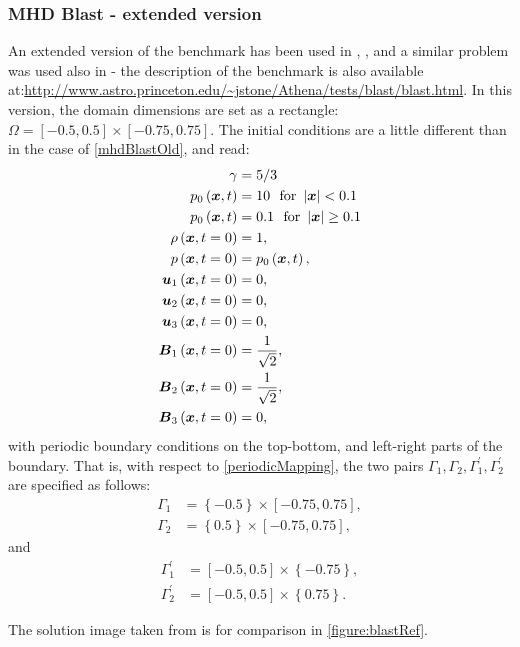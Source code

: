 \subsubsection{MHD Blast - extended version}
\label{sec:blastNew}
An extended version of the benchmark has been used in \cite{blastNew1}, \cite{athenaBlast}, and a similar problem was used also in \cite{blastNew2} - the description of the benchmark is also available at:\url{http://www.astro.princeton.edu/~jstone/Athena/tests/blast/blast.html}.
In this version, the domain dimensions are set as a rectangle: $\Omega = [-0.5, 0.5] \times [-0.75, 0.75]$.
The initial conditions are a little different than in the case of \cref{mhdBlastOld}, and read:
\begin{align}
\label{mhdBlastNew}
\gamma & =  5 / 3\\ \nonumber
p_0\left(\mbox{\boldmath $x$}, t\right) & =  10\ \ \text{for}\ \left|\mbox{\boldmath $x$}\right| < 0.1\\ \nonumber
p_0\left(\mbox{\boldmath $x$}, t\right) & =  0.1\ \ \text{for}\ \left|\mbox{\boldmath $x$}\right| \geq 0.1\\ \nonumber
\rho\left(\mbox{\boldmath $x$}, t = 0\right) & =  1,\\ \nonumber
p\left(\mbox{\boldmath $x$}, t = 0\right) & =  p_0\left(\mbox{\boldmath $x$}, t\right),\\ \nonumber
\mbox{\boldmath $u$}_1\left(\mbox{\boldmath $x$}, t = 0\right) & =  0,\\ \nonumber
\mbox{\boldmath $u$}_2\left(\mbox{\boldmath $x$}, t = 0\right) & =  0,\\ \nonumber
\mbox{\boldmath $u$}_3\left(\mbox{\boldmath $x$}, t = 0\right) & =  0,\\ \nonumber
\mbox{\boldmath $B$}_1\left(\mbox{\boldmath $x$}, t = 0\right) & =  \frac{1}{\sqrt{2}},\\ \nonumber
\mbox{\boldmath $B$}_2\left(\mbox{\boldmath $x$}, t = 0\right) & =  \frac{1}{\sqrt{2}},\\ \nonumber
\mbox{\boldmath $B$}_3\left(\mbox{\boldmath $x$}, t = 0\right) & =  0,
\end{align}
with periodic boundary conditions on the top-bottom, and left-right parts of the boundary. That is, with respect to \cref{periodicMapping}, the two pairs $\Gamma_1, \Gamma_2, \Gamma_1^{'}, \Gamma_2^{'}$ are specified as follows:
\begin{align}
\Gamma_1 & = \left\{-0.5\right\} \times [-0.75, 0.75],\\
\Gamma_2 & = \left\{0.5\right\} \times [-0.75, 0.75],
\end{align}
and
\begin{align}
\Gamma_1^{'} & = [-0.5, 0.5] \times \left\{-0.75\right\},\\
\Gamma_2^{'} & = [-0.5, 0.5] \times \left\{0.75\right\}.
\end{align}

The solution image taken from \cite{blastNew1} is for comparison in \cref{figure:blastRef}.

